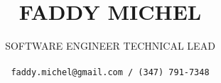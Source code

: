 \title{
\uppercase{Faddy Michel}
}

\author{
\uppercase{Software Engineer Technical Lead}\\ \\
\texttt{faddy.michel@gmail.com / (347) 791-7348}
}

\date{}

\maketitle
